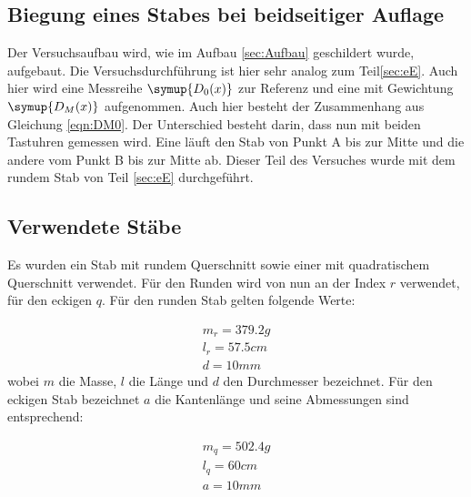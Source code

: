 \subsection{Biegung eines Stabes bei beidseitiger Auflage}
\label{sec:bA}
Der Versuchsaufbau wird, wie im Aufbau \ref{sec:Aufbau} geschildert wurde,
aufgebaut. Die Versuchsdurchführung ist hier sehr analog zum Teil\ref{sec:eE}.
Auch hier wird eine Messreihe $\symup{D_0 (x)}$ zur Referenz und eine mit
Gewichtung $\symup{D_M (x)}$ aufgenommen.
Auch hier besteht der Zusammenhang aus Gleichung \eqref{eqn:DM0}.
Der Unterschied besteht darin,
dass nun mit beiden Tastuhren gemessen wird. Eine läuft den Stab von Punkt A bis
zur Mitte und die andere vom Punkt B bis zur Mitte ab. Dieser Teil des Versuches
wurde mit dem rundem Stab von Teil \ref{sec:eE} durchgeführt.

\subsection{Verwendete Stäbe}
\label{sec:Stäbe}

Es wurden ein Stab mit rundem Querschnitt sowie einer mit quadratischem Querschnitt verwendet.  Für den Runden wird von nun an der Index $r$ verwendet, für den eckigen $q$. Für den runden Stab gelten folgende Werte:

\begin{gather*}
  m_r = 379.2g \\
  l_r = 57.5cm \\
  d= 10mm
\end{gather*}
wobei $m$ die Masse, $l$ die Länge und $d$ den Durchmesser bezeichnet.
Für den eckigen Stab bezeichnet $a$ die Kantenlänge und seine Abmessungen sind entsprechend:

\begin{gather*}
  m_q = 502.4g \\
  l_q = 60cm   \\
  a = 10mm
\end{gather*}
